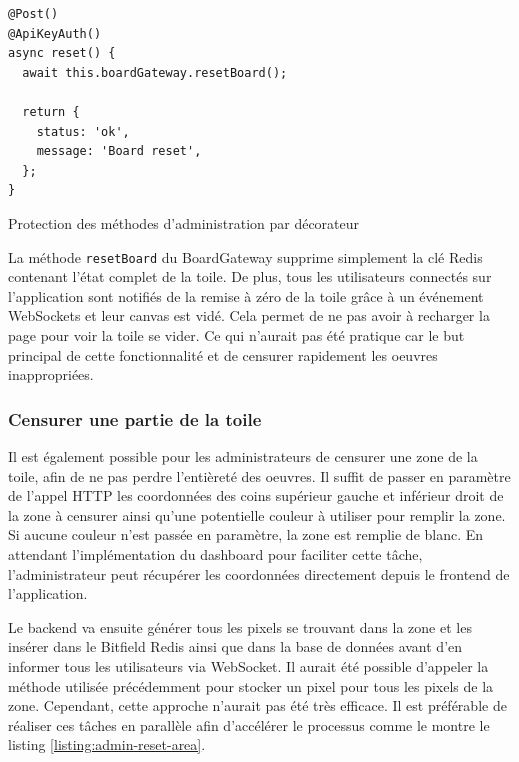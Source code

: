 \begin{listing}[h]
  \begin{verbatim}
@Post()
@ApiKeyAuth()
async reset() {
  await this.boardGateway.resetBoard();

  return {
    status: 'ok',
    message: 'Board reset',
  };
}
\end{verbatim}
  \caption{Protection des méthodes d'administration par décorateur}
  \label{listing:admin-methods-auth}
\end{listing}

La méthode \texttt{resetBoard} du BoardGateway supprime simplement la clé Redis contenant l'état complet de la toile. De plus, tous les utilisateurs connectés sur l'application sont notifiés de la remise à zéro de la toile grâce à un événement WebSockets et leur canvas est vidé. Cela permet de ne pas avoir à recharger la page pour voir la toile se vider. Ce qui n'aurait pas été pratique car le but principal de cette fonctionnalité et de censurer rapidement les oeuvres inappropriées.

\subsubsection{Censurer une partie de la toile}

Il est également possible pour les administrateurs de censurer une zone de la toile, afin de ne pas perdre l'entièreté des oeuvres. Il suffit de passer en paramètre de l'appel HTTP les coordonnées des coins supérieur gauche et inférieur droit de la zone à censurer ainsi qu'une potentielle couleur à utiliser pour remplir la zone. Si aucune couleur n'est passée en paramètre, la zone est remplie de blanc. En attendant l'implémentation du dashboard pour faciliter cette tâche, l'administrateur peut récupérer les coordonnées directement depuis le frontend de l'application.

Le backend va ensuite générer tous les pixels se trouvant dans la zone et les insérer dans le Bitfield Redis ainsi que dans la base de données avant d'en informer tous les utilisateurs via WebSocket. Il aurait été possible d'appeler la méthode utilisée précédemment pour stocker un pixel pour tous les pixels de la zone. Cependant, cette approche n'aurait pas été très efficace. Il est préférable de réaliser ces tâches en parallèle afin d'accélérer le processus comme le montre le listing \ref{listing:admin-reset-area}.

